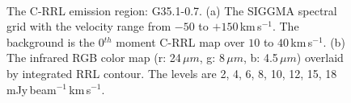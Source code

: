 \documentclass[manuscript]{aastex61}
\newcommand{\kms}{\,km\,s$^{-1}$}
\newcommand{\um}{\mu m}
\begin{document}
\begin{figure}[H]
	\centering
	\\
	\caption{The C-RRL emission region: G35.1-0.7.
	(a) The SIGGMA spectral grid with the velocity range from $-50$ to $+150$\kms.
	The background is the 0$^{th}$ moment C-RRL map over $10$ to $40$\kms.
	(b) The infrared RGB color map (r: 24\,$\um$, g: 8\,$\um$, b: 4.5\,$\um$) overlaid by integrated RRL contour.
	The levels are 2, 4, 6, 8, 10, 12, 15, 18 mJy\,beam$^{-1}$\kms.}
	\label{fig_crrl-g351}
\end{figure}
\end{document}
